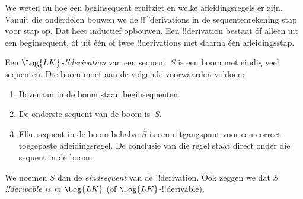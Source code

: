 \documentclass[../../../include/open-logic-section]{subfiles}
\begin{document}
      {}
      {}


\begin{explain}
We weten nu hoe een beginsequent eruitziet en welke afleidingsregels er
zijn. Vanuit die onderdelen bouwen we de !!^{derivation}s in de
sequentenrekening stap voor stap op. Dat heet inductief opbouwen. Een
!!{derivation} bestaat óf alleen uit een beginsequent, óf uit één of
twee !!{derivation}s met daarna één afleidingsstap.
\end{explain}

\begin{defn}
Een \emph{$\Log{LK}$-!!{derivation}} van een sequent~$S$ is een boom
met eindig veel sequenten. Die boom moet aan de volgende voorwaarden
voldoen:
\begin{enumerate}
\item Bovenaan in de boom staan beginsequenten.
\item De onderste sequent van de boom is~$S$.
\item Elke sequent in de boom behalve $S$ is een uitgangspunt voor een
  correct toegepaste afleidingsregel. De conclusie van die regel staat
  direct onder die sequent in de boom.
\end{enumerate}
We noemen $S$ dan de \emph{eindsequent} van de !!{derivation}. Ook
zeggen we dat $S$ \emph{!!{derivable} is in $\Log{LK}$} (of
$\Log{LK}$-!!{derivable}).
\end{defn}
\end{document}
